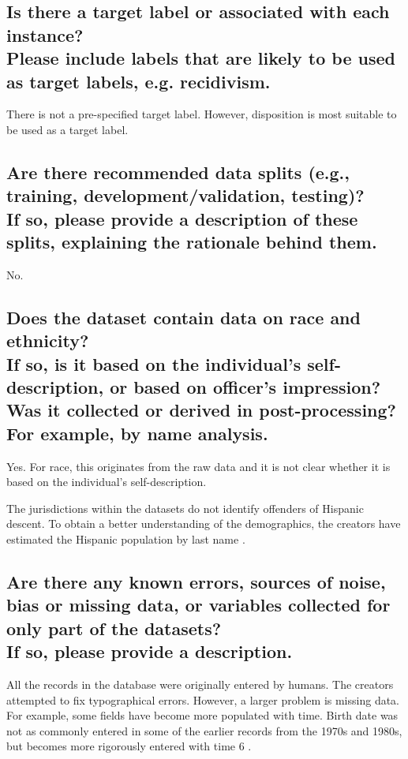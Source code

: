 \documentclass[letterpaper, 10 pt, conference]{ieeeconf}  %
\newcommand{\subtitle}[1]{{\\ \small \normalfont \color{purple} #1}}
\begin{document}
\subsection{Is there a target label or associated with each instance? \subtitle{Please include labels that are likely to be used as target labels, e.g. recidivism.}}

There is not a pre-specified target label. However, disposition is most suitable to be used as a target label. 

\subsection{Are there recommended data splits (e.g., training, development/validation, testing)? \subtitle{If so, please provide a description of these splits, explaining the rationale behind them.}}

No.

\subsection{Does the dataset contain data on race and ethnicity? \subtitle{If so, is it based on the individual's self-description, or based on officer's impression? Was it collected or derived in post-processing? For example, by name analysis.}}

Yes. For race, this originates from the raw data and it is not clear whether it is based on the individual's self-description. 

The jurisdictions within the datasets do not identify offenders of Hispanic descent. To obtain a better understanding of the demographics, the creators have estimated the Hispanic population by last name \cite{ormachea2015new}.

\subsection{Are there any known errors, sources of noise, bias or missing data, or variables collected for only part of the datasets? \subtitle{If so, please provide a description.}}

All the records in the database were originally
entered by humans. The creators attempted to fix typographical errors. However, a larger problem is missing data. For example, some fields have become more populated with time. Birth date was not as commonly entered in some of the earlier records from the 1970s and 1980s, but becomes more rigorously entered with time 6 \cite{ormachea2015new}. 
\end{document}
